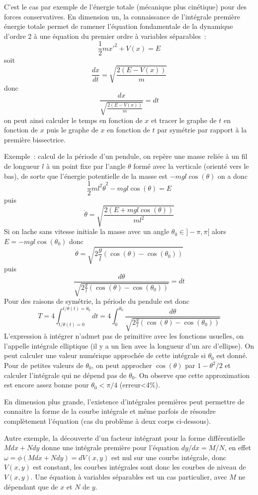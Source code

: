 \documentclass[a4paper,11pt]{book}
\begin{document}
\begin{giacjshere}
C'est le cas par exemple de
l'\'energie totale (m\'ecanique plus cin\'etique) pour des forces
conservatives.  En dimension un, la connaissance de l'int\'egrale 
premi\`ere \'energie
totale permet de ramener l'\'equation fondamentale de la
dynamique d'ordre 2 \`a une \'equation
du premier ordre \`a variables s\'eparables~:
$$ \frac{1}{2} m x'^2+ V(x) = E $$
soit
$$ \frac{dx}{dt} = \sqrt{\frac{2(E-V(x))}{m}}$$
donc 
$$ \frac{dx}{\sqrt{\frac{2(E-V(x))}{m}}}=dt$$
on peut ainsi calculer le temps en fonction de $x$ et tracer
le graphe de $t$ en fonction de $x$ puis le graphe de $x$ en fonction
de $t$  par sym\'etrie
par rapport \`a la premi\`ere bissectrice.

Exemple~: calcul de la p\'eriode d'un pendule, on rep\`ere
une masse reli\'ee \`a un fil de longueur $l$ \`a un point fixe
par l'angle $\theta$ form\'e avec la verticale (orient\'e vers le
bas), de sorte que
l'\'energie potentielle de la masse est $-mgl\cos(\theta)$
on a donc 
$$ \frac{1}{2} m l^2\dot{\theta}^2-mgl\cos(\theta)=E$$
puis
$$ \dot{\theta}=\sqrt{\frac{2(E+mgl\cos(\theta))}{ml^2}}$$
Si on lache sans vitesse initiale la masse avec un angle 
$\theta_0 \in ]-\pi,\pi[$ alors
$E=-mgl\cos(\theta_0)$ donc
$$ \dot{\theta}=\sqrt{2\frac{g}{l}(\cos(\theta)-\cos(\theta_0))}$$
puis
$$ \frac{d\theta}{\sqrt{2\frac{g}{l}(\cos(\theta)-\cos(\theta_0))}}
= dt $$
Pour des raisons de sym\'etrie, la p\'eriode du pendule est donc
$$ T=4\int_{t/\theta(t)=0}^{t/\theta(t)=\theta_0} dt 
=4 \int_0^{\theta_0} \frac{d\theta}{\sqrt{2\frac{g}{l}(\cos(\theta)-\cos(\theta_0))}} $$
L'expression \`a int\'egrer n'admet pas de primitive avec les fonctions
usuelles, on l'appelle int\'egrale elliptique (il y a un lien avec
la longueur d'un arc d'ellipse). On peut calculer une valeur num\'erique
approch\'ee de cette int\'egrale si $\theta_0$ est donn\'e.
Pour de petites valeurs de $\theta_0$, on peut approcher 
$\cos(\theta)$ par $1-\theta^2/2$ et calculer l'int\'egrale
qui ne d\'epend pas de $\theta_0$. On observe que cette approximation 
est encore assez bonne pour $\theta_0<\pi/4$ (erreur<4\%).

En dimension plus grande, l'existence d'int\'egrales
premi\`eres peut permettre de 
connaitre la forme de la courbe int\'egrale et m\^eme
parfois de r\'esoudre compl\`etement l'\'equation (cas du probl\`eme
\`a deux corps ci-dessous).
 
Autre exemple, la d\'ecouverte d'un facteur 
int\'egrant pour la forme diff\'erentielle $Mdx+Ndy$
donne une int\'egrale premi\`ere pour l'\'equation $dy/dx=M/N$,
en effet $\omega=\phi(Mdx+Ndy)=dV(x,y)$ est nul
sur une courbe int\'egrale, donc $V(x,y)$
est constant, les courbes int\'egrales sont donc 
les courbes de niveau de $V(x,y)$. Une \'equation \`a variables
s\'eparables est un cas particulier, avec $M$ ne d\'ependant que de
$x$ et $N$ de $y$.


\end{giacjshere}
\end{document}
